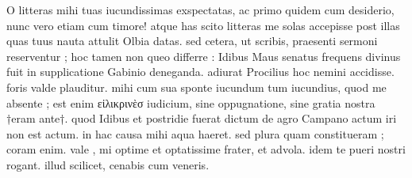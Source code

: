 


 O litteras mihi tuas iucundissimas exspectatas, ac primo quidem cum desiderio, nunc vero etiam cum timore! atque has scito litteras me solas accepisse post illas quas tuus nauta attulit Olbia datas. sed cetera, ut scribis, praesenti sermoni reserventur ; hoc tamen non queo differre : Idibus Maus senatus frequens divinus fuit in supplicatione Gabinio deneganda. adiurat Procilius hoc nemini accidisse. foris valde plauditur. mihi cum sua sponte iucundum tum iucundius, quod me absente ; est enim εἰλικρινὲσ iudicium, sine oppugnatione, sine gratia nostra †eram ante†. quod Idibus et postridie fuerat dictum de agro Campano actum iri non est actum. in hac causa mihi aqua haeret. sed plura quam constitueram ; coram enim. vale , mi optime et optatissime frater, et advola. idem te pueri nostri rogant. illud scilicet, cenabis cum veneris.
